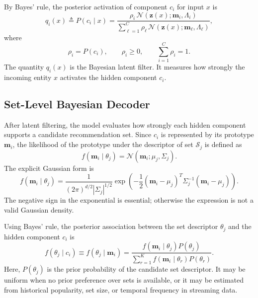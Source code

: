 \documentclass{article}
\theoremstyle{plain}
\theoremstyle{definition}
\theoremstyle{remark}
\begin{document}
By Bayes' rule, the posterior activation of component \(c_i\) for input \(x\) is
\begin{equation}
	\label{eq:posterior_component}
	q_i(x)
	\triangleq
	P(c_i\mid x)
	=
	\frac{
		\rho_i\,\mathcal N(\mathbf z(x);\mathbf m_i,\Lambda_i)
	}{
		\sum_{\ell=1}^{C}
		\rho_\ell\,\mathcal N(\mathbf z(x);\mathbf m_\ell,\Lambda_\ell)
	},
\end{equation}
where
\[
\rho_i=P(c_i),
\qquad
\rho_i\geq 0,
\qquad
\sum_{i=1}^{C}\rho_i=1.
\]
The quantity \(q_i(x)\) is the Bayesian latent filter. It measures how strongly the incoming entity \(x\) activates the hidden component \(c_i\).

\subsection{Set-Level Bayesian Decoder}
\label{subsec:set_decoder}

After latent filtering, the model evaluates how strongly each hidden component supports a candidate recommendation set. Since \(c_i\) is represented by its prototype \(\mathbf m_i\), the likelihood of the prototype under the descriptor of set \(\mathcal S_j\) is defined as
\begin{equation}
	\label{eq:prototype_likelihood}
	f(\mathbf m_i\mid \theta_j)
	=
	\mathcal N(\mathbf m_i;\mu_j,\Sigma_j).
\end{equation}
The explicit Gaussian form is
\begin{equation}
	\label{eq:prototype_likelihood_expanded}
	f(\mathbf m_i\mid \theta_j)
	=
	\frac{1}{(2\pi)^{d/2}|\Sigma_j|^{1/2}}
	\exp\left(
	-\frac{1}{2}
	(\mathbf m_i-\mu_j)^T
	\Sigma_j^{-1}
	(\mathbf m_i-\mu_j)
	\right).
\end{equation}
The negative sign in the exponential is essential; otherwise the expression is not a valid Gaussian density.

Using Bayes' rule, the posterior association between the set descriptor \(\theta_j\) and the hidden component \(c_i\) is
\begin{equation}
	\label{eq:posterior_set}
	f(\theta_j\mid c_i)
	\equiv
	f(\theta_j\mid \mathbf m_i)
	=
	\frac{
		f(\mathbf m_i\mid\theta_j)P(\theta_j)
	}{
		\sum_{r=1}^{K}
		f(\mathbf m_i\mid\theta_r)P(\theta_r)
	}.
\end{equation}
Here, \(P(\theta_j)\) is the prior probability of the candidate set descriptor. It may be uniform when no prior preference over sets is available, or it may be estimated from historical popularity, set size, or temporal frequency in streaming data.
\end{document}
